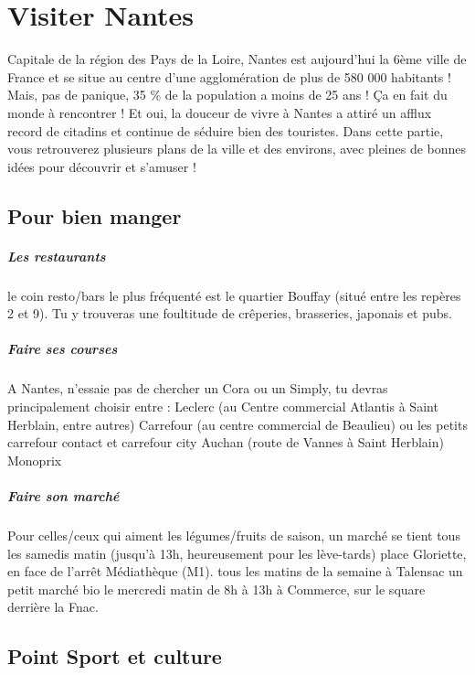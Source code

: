 \chapter{Visiter Nantes}\trad

Capitale de la région des Pays de la Loire, Nantes est aujourd'hui la 6ème ville de France et se situe au centre d'une agglomération de plus de 580 000 habitants ! Mais, pas de panique, 35 \% de la population a moins de 25 ans ! Ça en fait du monde à rencontrer ! Et oui, la douceur de vivre à Nantes a attiré un afflux record de citadins et continue de séduire bien des touristes.
Dans cette partie, vous retrouverez plusieurs plans de la ville et des environs, avec pleines de bonnes idées pour découvrir et s'amuser !

\section{Pour bien manger}\trad

\paragraph{Les restaurants} le coin resto/bars le plus fréquenté est le quartier Bouffay (situé entre les repères 2 et 9). Tu y trouveras une foultitude de crêperies, brasseries, japonais et pubs.
\paragraph{Faire ses courses} A Nantes, n'essaie pas de chercher un Cora ou un Simply, tu devras principalement choisir entre :
Leclerc (au Centre commercial Atlantis à Saint Herblain, entre autres)
Carrefour (au centre commercial de Beaulieu) ou les petits carrefour contact et carrefour city
Auchan (route de Vannes à Saint Herblain)
Monoprix
\paragraph{Faire son marché} Pour celles/ceux qui aiment les légumes/fruits de saison, un marché se tient
tous les samedis matin (jusqu'à 13h, heureusement pour les lève-tards) place Gloriette, en face de l'arrêt Médiathèque (M1).
tous les matins de la semaine à Talensac
un petit marché bio le mercredi matin de 8h à 13h à Commerce, sur le square derrière la Fnac.

\section{Point Sport et culture}\trad
